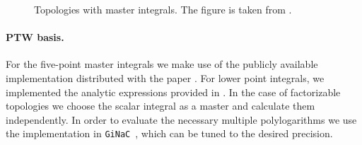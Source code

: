 \begin{figure}[ht]
\begin{center}
  \end{center}
  \caption{Topologies with master integrals.
    The figure is taken from \cite{Abreu:2017hqn}.
  }
  \label{fig:MasterInt}
\end{figure}


\paragraph{PTW basis.}
For the five-point master integrals we make use of the publicly available implementation distributed with the paper \cite{Papadopoulos:2015jft}.
For lower point integrals, we implemented the analytic expressions provided in \cite{Gehrmann:2000zt}.
In the case of factorizable topologies we choose the
scalar integral as a master and calculate them independently. In order
to evaluate the necessary multiple polylogarithms we use the
implementation in \texttt{GiNaC}~\cite{Vollinga:2004sn}, which can be
tuned to the desired precision.

